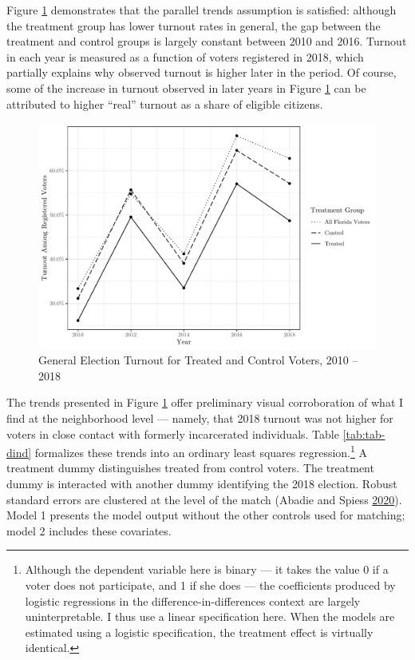 \documentclass[
  12pt,
]{article}
\begin{document}
Figure \ref{fig:dind} demonstrates that the parallel trends assumption is satisfied: although the treatment group has lower turnout rates in general, the gap between the treatment and control groups is largely constant between 2010 and 2016. Turnout in each year is measured as a function of voters registered in 2018, which partially explains why observed turnout is higher later in the period. Of course, some of the increase in turnout observed in later years in Figure \ref{fig:dind} can be attributed to higher ``real'' turnout as a share of eligible citizens.

\begin{figure}[H]

{\centering \includegraphics{amendment_4_turnout_blind_files/figure-latex/dind-1} 

}

\caption{\label{fig:dind}General Election Turnout for Treated and Control Voters, 2010 -- 2018}\label{fig:dind}
\end{figure}

The trends presented in Figure \ref{fig:dind} offer preliminary visual corroboration of what I find at the neighborhood level --- namely, that 2018 turnout was not higher for voters in close contact with formerly incarcerated individuals. Table \ref{tab:tab-dind} formalizes these trends into an ordinary least squares regression.\footnote{Although the dependent variable here is binary --- it takes the value 0 if a voter does not participate, and 1 if she does --- the coefficients produced by logistic regressions in the difference-in-differences context are largely uninterpretable. I thus use a linear specification here. When the models are estimated using a logistic specification, the treatment effect is virtually identical.} A treatment dummy distinguishes treated from control voters. The treatment dummy is interacted with another dummy identifying the 2018 election. Robust standard errors are clustered at the level of the match (Abadie and Spiess \protect\hyperlink{ref-Abadie2020}{2020}). Model 1 presents the model output without the other controls used for matching; model 2 includes these covariates.
\end{document}
